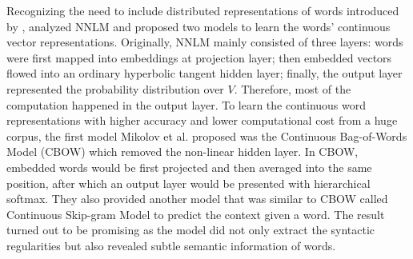 \documentclass[12pt]{diazessay} %
\begin{document}
Recognizing the need to include distributed representations of words introduced by \citet{hinton1984distributed}, \citet{mikolov2013efficient} analyzed NNLM and proposed two models to learn the words' continuous vector representations. Originally, NNLM mainly consisted of three layers: words were first mapped into embeddings at projection layer; then embedded vectors flowed into an ordinary hyperbolic tangent hidden layer; finally, the output layer represented the probability distribution over $V$. Therefore, most of the computation happened in the output layer. To learn the continuous word representations with higher accuracy and lower computational cost from a huge corpus, the first model Mikolov et al. proposed was the Continuous Bag-of-Words Model (CBOW) which removed the non-linear hidden layer. In CBOW, embedded words would be first projected and then averaged into the same position, after which an output layer would be presented with hierarchical softmax. They also provided another model that was similar to CBOW called Continuous Skip-gram Model to predict the context given a word. The result turned out to be promising as the model did not only extract the syntactic regularities but also revealed subtle semantic information of words.

\end{document}
